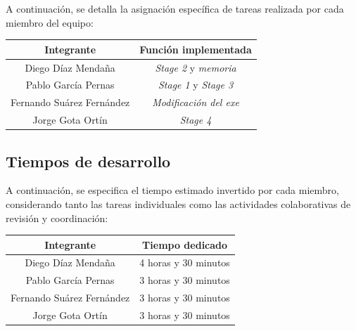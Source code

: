 \documentclass[11pt,a4paper]{article}
\begin{document}
\noindent A continuación, se detalla la asignación específica de tareas realizada por cada miembro del equipo: \vspace{1ex}
\begin{center}
  \renewcommand{\arraystretch}{1.2}
  \begin{tabular}{|c|c|}
    \hline
    \textbf{Integrante}\cellcolor{azulSuave} & \textbf{Función implementada}\cellcolor{azulSuave} \\
    \hline
    Diego Díaz Mendaña & \textit{Stage 2} y \textit{memoria} \\
    Pablo García Pernas & \textit{Stage 1} y \textit{Stage 3} \\
    Fernando Suárez Fernández & \textit{Modificación del exe} \\
    Jorge Gota Ortín & \textit{Stage 4} \\
    \hline
  \end{tabular}
\end{center}
\vspace{3ex}

\subsection{Tiempos de desarrollo}
A continuación, se especifica el tiempo estimado invertido por cada miembro, considerando tanto las tareas individuales como las actividades colaborativas de revisión y coordinación: \vspace{2ex}
\begin{center}
  \renewcommand{\arraystretch}{1.2}
  \begin{tabular}{|c|c|}
    \hline
    \textbf{Integrante}\cellcolor{azulSuave} & \textbf{Tiempo dedicado}\cellcolor{azulSuave} \\
    \hline
    Diego Díaz Mendaña & 4 horas y 30 minutos \\
    Pablo García Pernas & 3 horas y 30 minutos \\
    Fernando Suárez Fernández & 3 horas y 30 minutos \\
    Jorge Gota Ortín & 3 horas y 30 minutos\\
    \hline
  \end{tabular}
\end{center}
\end{document}
